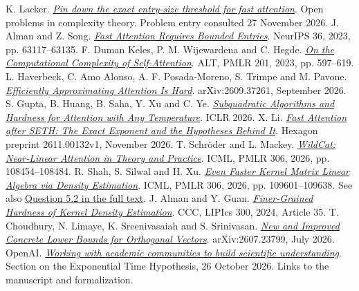 \documentclass[11pt,letterpaper]{article}
\newcommand{\paper}[2]{\href{#1}{\textit{#2}}}
\begin{document}
\begin{thebibliography}{10}
\setlength{\itemsep}{5pt}
 K. Lacker. \paper{https://lacker.io/complexity/problems/attention-bounded-entry-threshold.html}{Pin down the exact entry-size threshold for fast attention}. Open problems in complexity theory. Problem entry consulted 27 November 2026.
 J. Alman and Z. Song. \paper{https://arxiv.org/abs/2302.13214}{Fast Attention Requires Bounded Entries}. NeurIPS 36, 2023, pp. 63117--63135.
 F. Duman Keles, P. M. Wijewardena and C. Hegde. \paper{https://proceedings.mlr.press/v201/duman-keles23a.html}{On the Computational Complexity of Self-Attention}. ALT, PMLR 201, 2023, pp. 597--619.
 L. Haverbeck, C. Amo Alonso, A. F. Posada-Moreno, S. Trimpe and M. Pavone. \paper{https://arxiv.org/abs/2609.37261}{Efficiently Approximating Attention Is Hard}. arXiv:2609.37261, September 2026.
 S. Gupta, B. Huang, B. Saha, Y. Xu and C. Ye. \paper{https://arxiv.org/abs/2505.14840}{Subquadratic Algorithms and Hardness for Attention with Any Temperature}. ICLR 2026.
 X. Li. \paper{https://hexagonmath.org/pdf/2611.00132v1}{Fast Attention after SETH: The Exact Exponent and the Hypotheses Behind It}. Hexagon preprint 2611.00132v1, November 2026.
 T. Schr\"oder and L. Mackey. \paper{https://proceedings.mlr.press/v306/schroder26a.html}{WildCat: Near-Linear Attention in Theory and Practice}. ICML, PMLR 306, 2026, pp. 108454--108484.
 R. Shah, S. Silwal and H. Xu. \paper{https://proceedings.mlr.press/v306/shah26c.html}{Even Faster Kernel Matrix Linear Algebra via Density Estimation}. ICML, PMLR 306, 2026, pp. 109601--109638. See also \href{https://arxiv.org/html/2510.02540v2\#S5}{Question 5.2 in the full text}.
 J. Alman and Y. Guan. \paper{https://doi.org/10.4230/LIPIcs.CCC.2024.35}{Finer-Grained Hardness of Kernel Density Estimation}. CCC, LIPIcs 300, 2024, Article 35.
 T. Choudhury, N. Limaye, K. Sreenivasaiah and S. Srinivasan. \paper{https://arxiv.org/abs/2607.23799}{New and Improved Concrete Lower Bounds for Orthogonal Vectors}. arXiv:2607.23799, July 2026.
 OpenAI. \paper{https://openai.com/index/building-scientific-understanding-with-academic-communities/}{Working with academic communities to build scientific understanding}. Section on the Exponential Time Hypothesis, 26 October 2026. Links to the manuscript and formalization.
\end{thebibliography}
\end{document}
